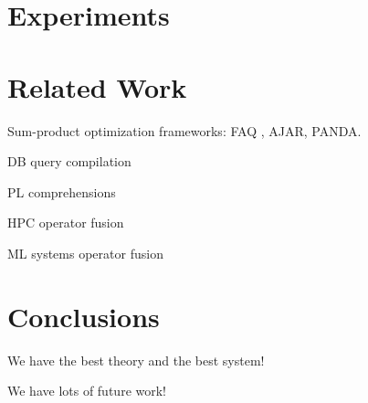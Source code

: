\documentclass{vldb}
\begin{document}
\section{Experiments}



\section{Related Work}
\label{sec:rwork}

Sum-product optimization frameworks: FAQ \cite{KhamisNR16}, AJAR, PANDA.

DB query compilation

PL comprehensions

HPC operator fusion

ML systems operator fusion

\section{Conclusions}

We have the best theory and the best system!

We have lots of future work!

\small

  
\normalsize
\end{document}

